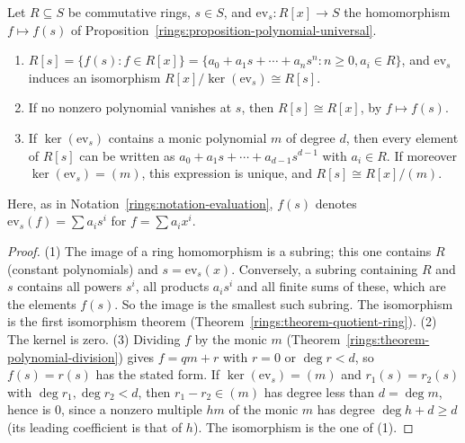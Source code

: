 \begin{proposition}\label{rings:proposition-adjoin}
Let $R \subseteq S$ be commutative rings, $s \in S$, and $\mathrm{ev}_s \colon R[x] \to S$ the homomorphism $f \mapsto f(s)$ of Proposition~\ref{rings:proposition-polynomial-universal}.
\begin{enumerate}
\item $R[s] = \{f(s) : f \in R[x]\} = \{a_0 + a_1s + \cdots + a_ns^n : n \geq 0, a_i \in R\}$, and $\mathrm{ev}_s$ induces an isomorphism $R[x]/\ker(\mathrm{ev}_s) \cong R[s]$.
\item If no nonzero polynomial vanishes at $s$, then $R[s] \cong R[x]$, by $f \mapsto f(s)$.
\item If $\ker(\mathrm{ev}_s)$ contains a monic polynomial $m$ of degree $d$, then every element of $R[s]$ can be written as $a_0 + a_1s + \cdots + a_{d-1}s^{d-1}$ with $a_i \in R$. If moreover
$\ker(\mathrm{ev}_s) = (m)$, this expression is unique, and $R[s] \cong R[x]/(m)$.
\end{enumerate}
Here, as in Notation~\ref{rings:notation-evaluation}, $f(s)$ denotes $\mathrm{ev}_s(f) = \sum a_is^i$ for $f = \sum a_ix^i$.
\end{proposition}

\begin{proof}
(1) The image of a ring homomorphism is a subring; this one contains $R$ (constant polynomials) and $s = \mathrm{ev}_s(x)$. Conversely, a subring containing $R$ and $s$ contains all powers $s^i$, all products $a_is^i$ and all
finite sums of these, which are the elements $f(s)$. So the image is the smallest such subring. The isomorphism is the first isomorphism theorem (Theorem~\ref{rings:theorem-quotient-ring}). (2) The kernel is zero.
(3) Dividing $f$ by the monic $m$ (Theorem~\ref{rings:theorem-polynomial-division}) gives $f = qm + r$ with $r = 0$ or $\deg r < d$, so $f(s) = r(s)$ has the stated form. If $\ker(\mathrm{ev}_s) = (m)$ and
$r_1(s) = r_2(s)$ with $\deg r_1, \deg r_2 < d$, then $r_1 - r_2 \in (m)$ has degree less than $d = \deg m$, hence is $0$, since a nonzero multiple $hm$ of the monic $m$ has degree $\deg h + d \geq d$ (its leading coefficient is that of $h$). The isomorphism is the one of (1).
\end{proof}

